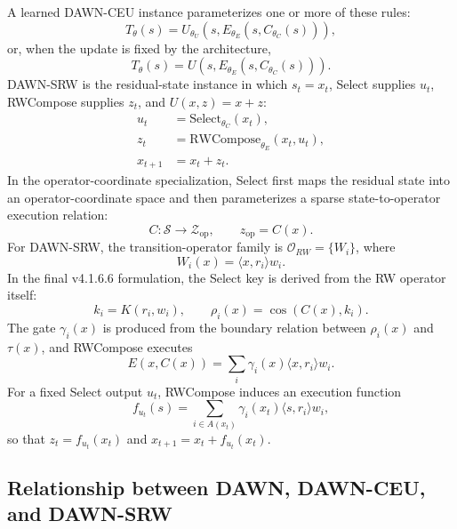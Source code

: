 \documentclass{article}
\begin{document}
A learned DAWN-CEU instance parameterizes one or more of these rules:
\begin{equation}
    T_\theta(s)=U_{\theta_U}\!\left(s,E_{\theta_E}(s,C_{\theta_C}(s))\right),
    \label{eq:app_learned_ceu_transition}
\end{equation}
or, when the update is fixed by the architecture,
\begin{equation}
    T_\theta(s)=U\!\left(s,E_{\theta_E}(s,C_{\theta_C}(s))\right).
    \label{eq:app_learned_ceu_fixed_update}
\end{equation}
DAWN-SRW is the residual-state instance in which $s_t=x_t$, Select supplies $u_t$, RWCompose supplies $z_t$, and $U(x,z)=x+z$:
\begin{align}
    u_t &= \mathrm{Select}_{\theta_C}(x_t), \\
    z_t &= \mathrm{RWCompose}_{\theta_E}(x_t,u_t), \\
    x_{t+1} &= x_t+z_t.
\end{align}
In the operator-coordinate specialization, Select first maps the residual state into an operator-coordinate space and then parameterizes a sparse state-to-operator execution relation:
\begin{equation}
    C:\mathcal{S}\to\mathcal{Z}_{\mathrm{op}},\qquad z_{\mathrm{op}}=C(x).
\end{equation}
For DAWN-SRW, the transition-operator family is \(\mathcal{O}_{RW}=\{W_i\}\), where
\begin{equation}
    W_i(x)=\langle x,r_i\rangle w_i.
\end{equation}
In the final v4.1.6.6 formulation, the Select key is derived from the RW operator itself:
\begin{equation}
    k_i=K(r_i,w_i),\qquad \rho_i(x)=\cos(C(x),k_i).
\end{equation}
The gate \(\gamma_i(x)\) is produced from the boundary relation between \(\rho_i(x)\) and \(\tau(x)\), and RWCompose executes
\begin{equation}
    E(x,C(x))=\sum_i \gamma_i(x)\langle x,r_i\rangle w_i.
\end{equation}
For a fixed Select output $u_t$, RWCompose induces an execution function
\begin{equation}
    f_{u_t}(s)=\sum_{i\in A(x_t)}\gamma_i(x_t)\langle s,r_i\rangle w_i,
\end{equation}
so that $z_t=f_{u_t}(x_t)$ and $x_{t+1}=x_t+f_{u_t}(x_t)$.

\subsection{Relationship between DAWN, DAWN-CEU, and DAWN-SRW}
\end{document}
